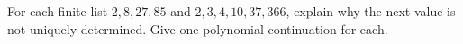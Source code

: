 For each finite list $2,8,27,85$ and $2,3,4,10,37,366$, explain why the next value is not uniquely determined. Give one polynomial continuation for each.
